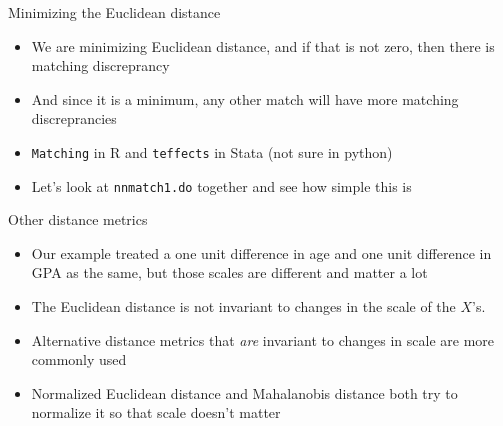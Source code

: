 \documentclass{beamer}
\begin{document}



\begin{frame}{Minimizing the Euclidean distance}

\begin{itemize}
\item We are minimizing Euclidean distance, and if that is not zero, then there is matching discreprancy
\item And since it is a minimum, any other match will have more matching discreprancies
\item \texttt{Matching} in R and \texttt{teffects} in Stata (not sure in python)
\item Let's look at \texttt{nnmatch1.do} together and see how simple this is
\end{itemize}

\end{frame}




 




\begin{frame}{Other distance metrics}

\begin{itemize}
\item Our example treated a one unit difference in age and one unit difference in GPA as the same, but those scales are different and matter a lot
\item The Euclidean distance is not invariant to changes in the scale of the $X$'s.  
\item Alternative distance metrics that \emph{are} invariant to changes in scale are more commonly used 
\item Normalized Euclidean distance and Mahalanobis distance both try to normalize it so that scale doesn't matter
\end{itemize}

\end{frame}
\end{document}

